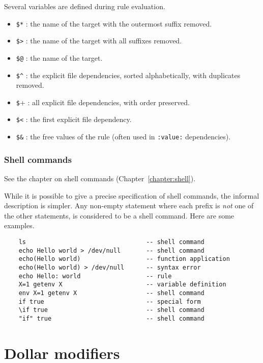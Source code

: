 Several variables are defined during rule evaluation.

\begin{itemize}
\item \verb+$*+ : the name of the target with the outermost suffix removed.
\item \verb+$>+ : the name of the target with all suffixes removed.
\item \verb+$@+ : the name of the target.
\item \verb+$^+ : the explicit file dependencies, sorted alphabetically, with duplicates removed.
\item \verb+$++ : all explicit file dependencies, with order preserved.
\item \verb+$<+ : the first explicit file dependency.
\item \verb+$&+ : the free values of the rule (often used in \verb+:value:+ dependencies).
\end{itemize}

\subsubsection{Shell commands}

See the chapter on shell commands (Chapter~\ref{chapter:shell}).

While it is possible to give a precise specification of shell commands, the informal description is
simpler.  Any non-empty statement where each prefix is \emph{not} one of the other statements, is
considered to be a shell command.  Here are some examples.

\begin{verbatim}
    ls                                 -- shell command
    echo Hello world > /dev/null       -- shell command
    echo(Hello world)                  -- function application
    echo(Hello world) > /dev/null      -- syntax error
    echo Hello: world                  -- rule
    X=1 getenv X                       -- variable definition
    env X=1 getenv X                   -- shell command
    if true                            -- special form
    \if true                           -- shell command
    "if" true                          -- shell command
\end{verbatim}
    

%
\section{Dollar modifiers}
\label{section:dollar}

